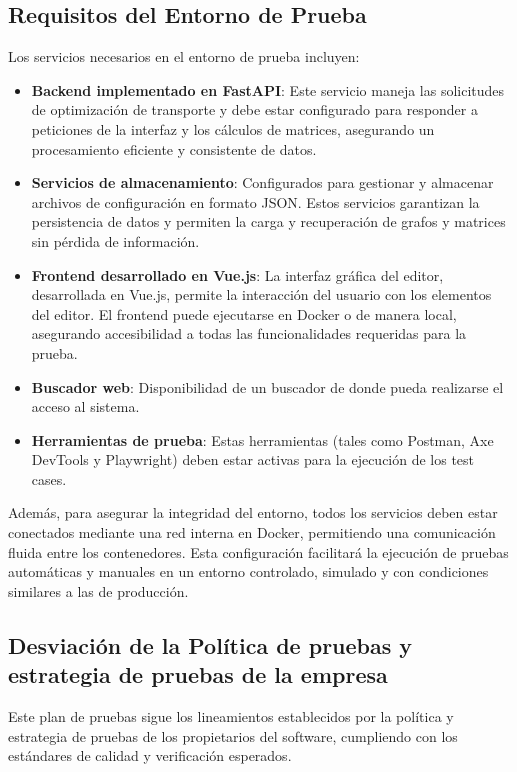 \documentclass[stu, 12pt, letterpaper, donotrepeattitle, floatsintext, natbib]{apa7}
\begin{document}
\subsection{Requisitos del Entorno de Prueba}
Los servicios necesarios en el entorno de prueba incluyen:

\begin{itemize}
    \item \textbf{Backend implementado en FastAPI}: Este servicio maneja las solicitudes de optimización de transporte y debe estar configurado para responder a peticiones de la interfaz y los cálculos de matrices, asegurando un procesamiento eficiente y consistente de datos.
    \item \textbf{Servicios de almacenamiento}: Configurados para gestionar y almacenar archivos de configuración en formato JSON. Estos servicios garantizan la persistencia de datos y permiten la carga y recuperación de grafos y matrices sin pérdida de información.
    \item \textbf{Frontend desarrollado en Vue.js}: La interfaz gráfica del editor, desarrollada en Vue.js, permite la interacción del usuario con los elementos del editor. El frontend puede ejecutarse en Docker o de manera local, asegurando accesibilidad a todas las funcionalidades requeridas para la prueba.
    \item \textbf{Buscador web}: Disponibilidad de un buscador de donde pueda realizarse el acceso al sistema.
    \item \textbf{Herramientas de prueba}: Estas herramientas (tales como Postman, Axe DevTools y Playwright) deben estar activas para la ejecución de los test cases.

\end{itemize}

Además, para asegurar la integridad del entorno, todos los servicios deben estar conectados mediante una red interna en Docker, permitiendo una comunicación fluida entre los contenedores. Esta configuración facilitará la ejecución de pruebas automáticas y manuales en un entorno controlado, simulado y con condiciones similares a las de producción.

\subsection{Desviación de la Política de pruebas y estrategia de pruebas de la empresa}
Este plan de pruebas sigue los lineamientos establecidos por la política y estrategia de pruebas de los propietarios del software, cumpliendo con los estándares de calidad y verificación esperados.
\newpage
\renewcommand\refname{\large\textbf{Referencias}}


\cite{nielsen1994}
\cite{dennis2015}
\cite{gregory2023}
\end{document}
